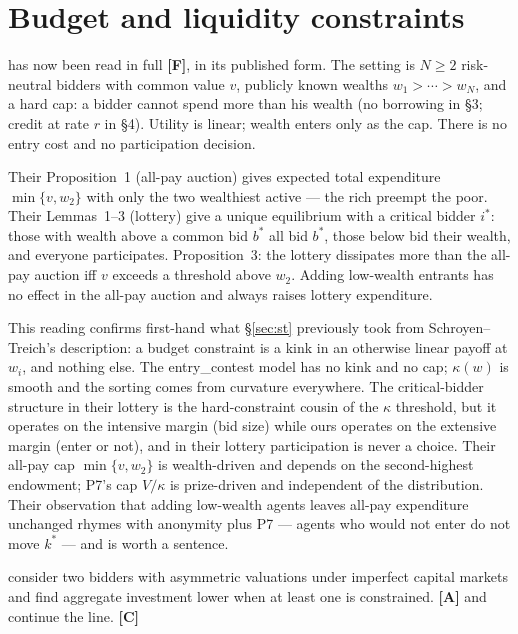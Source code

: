 \documentclass[11pt,a4paper]{article}
\begin{document}
\section{Budget and liquidity constraints}

\citet{CheGale1997} has now been read in full \textbf{[F]}, in its published
form. The setting is $N \geq 2$ risk-neutral bidders with common value $v$,
publicly known wealths $w_1 > \cdots > w_N$, and a hard cap: a bidder cannot
spend more than his wealth (no borrowing in \S3; credit at rate $r$ in \S4).
Utility is linear; wealth enters only as the cap. There is no entry cost and no
participation decision.

Their Proposition~1 (all-pay auction) gives expected total expenditure
$\min\{v, w_2\}$ with only the two wealthiest active --- the rich preempt the
poor. Their Lemmas~1--3 (lottery) give a unique equilibrium with a critical
bidder $i^*$: those with wealth above a common bid $b^*$ all bid $b^*$, those
below bid their wealth, and everyone participates. Proposition~3: the lottery
dissipates more than the all-pay auction iff $v$ exceeds a threshold above
$w_2$. Adding low-wealth entrants has no effect in the all-pay auction and
always raises lottery expenditure.

This reading confirms first-hand what \S\ref{sec:st} previously took from
Schroyen--Treich's description: a budget constraint is a kink in an otherwise
linear payoff at $w_i$, and nothing else. The entry\_contest model has no kink
and no cap; $\kappa(w)$ is smooth and the sorting comes from curvature
everywhere. The critical-bidder structure in their lottery is the
hard-constraint cousin of the $\kappa$ threshold, but it operates on the
intensive margin (bid size) while ours operates on the extensive margin (enter
or not), and in their lottery participation is never a choice. Their all-pay
cap $\min\{v, w_2\}$ is wealth-driven and depends on the second-highest
endowment; P7's cap $V/\kappa$ is prize-driven and independent of the
distribution. Their observation that adding low-wealth agents leaves all-pay
expenditure unchanged rhymes with anonymity plus P7 --- agents who would not
enter do not move $k^*$ --- and is worth a sentence.

\citet{GrossmannDietl2012} consider two bidders with asymmetric valuations under
imperfect capital markets and find aggregate investment lower when at least one
is constrained. \textbf{[A]} \citet{GrossmannHottiger2020} and
\citet{CheGale1998} continue the line. \textbf{[C]}
\end{document}
